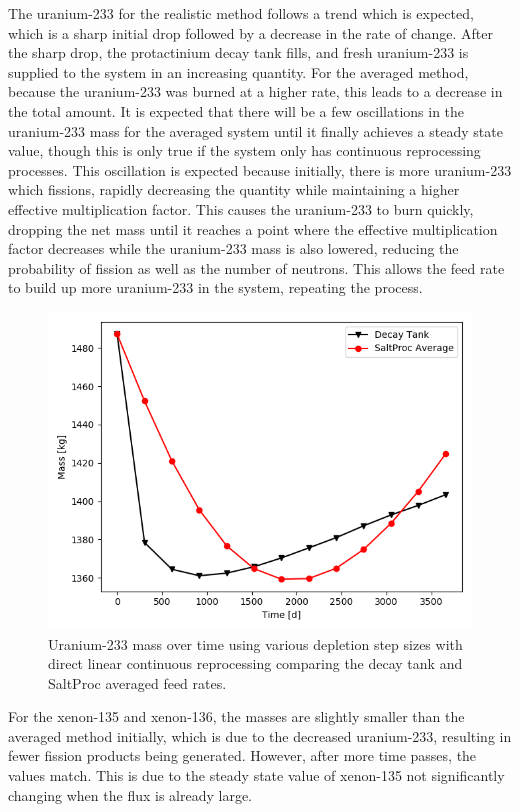 The uranium-233 for the realistic method follows a trend which is expected, which is a sharp initial drop followed by a decrease in the rate of change. After the sharp drop, the protactinium decay tank fills, and fresh uranium-233 is supplied to the system in an increasing quantity. For the averaged method, because the uranium-233 was burned at a higher rate, this leads to a decrease in the total amount. It is expected that there will be a few oscillations in the uranium-233 mass for the averaged system until it finally achieves a steady state value, though this is only true if the system only has continuous reprocessing processes. This oscillation is expected because initially, there is more uranium-233 which fissions, rapidly decreasing the quantity while maintaining a higher effective multiplication factor. This causes the uranium-233 to burn quickly, dropping the net mass until it reaches a point where the effective multiplication factor decreases while the uranium-233 mass is also lowered, reducing the probability of fission as well as the number of neutrons. This allows the feed rate to build up more uranium-233 in the system, repeating the process.

\begin{figure}[H]
  \centering
  \includegraphics[scale=0.7]{images/adv-U233.png}
  \caption{Uranium-233 mass over time using various depletion step sizes with direct linear continuous reprocessing comparing the decay tank and SaltProc averaged feed rates.}
   \label{fig:DL-cont-u-adv}
\end{figure}

For the xenon-135 and xenon-136, the masses are slightly smaller than the averaged method initially, which is due to the decreased uranium-233, resulting in fewer fission products being generated. However, after more time passes, the values match. This is due to the steady state value of xenon-135 not significantly changing when the flux is already large.

